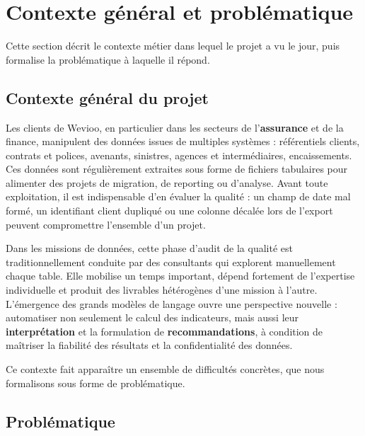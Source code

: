 \section{Contexte général et problématique}

Cette section décrit le contexte métier dans lequel le projet a vu le jour, puis formalise la problématique à laquelle il répond.

\subsection{Contexte général du projet}

Les clients de Wevioo, en particulier dans les secteurs de l'\textbf{assurance} et de la finance, manipulent des données issues de multiples systèmes : référentiels clients, contrats et polices, avenants, sinistres, agences et intermédiaires, encaissements. Ces données sont régulièrement extraites sous forme de fichiers tabulaires pour alimenter des projets de migration, de reporting ou d'analyse. Avant toute exploitation, il est indispensable d'en évaluer la qualité : un champ de date mal formé, un identifiant client dupliqué ou une colonne décalée lors de l'export peuvent compromettre l'ensemble d'un projet.

Dans les missions de données, cette phase d'audit de la qualité est traditionnellement conduite par des consultants qui explorent manuellement chaque table. Elle mobilise un temps important, dépend fortement de l'expertise individuelle et produit des livrables hétérogènes d'une mission à l'autre. L'émergence des grands modèles de langage ouvre une perspective nouvelle : automatiser non seulement le calcul des indicateurs, mais aussi leur \textbf{interprétation} et la formulation de \textbf{recommandations}, à condition de maîtriser la fiabilité des résultats et la confidentialité des données.

Ce contexte fait apparaître un ensemble de difficultés concrètes, que nous formalisons sous forme de problématique.

\subsection{Problématique}

